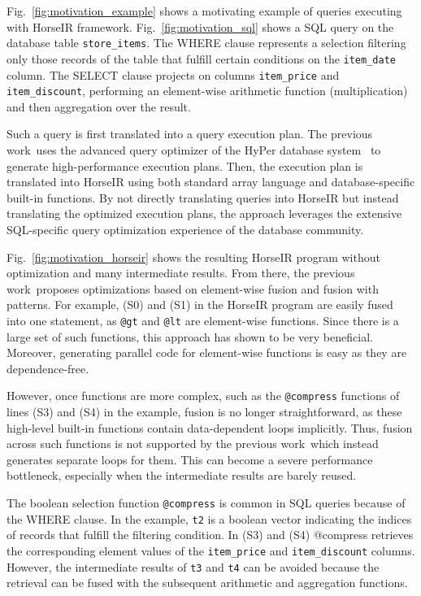 

Fig.~\ref{fig:motivation_example} shows a motivating example of queries
executing with HorseIR framework. Fig.~\ref{fig:motivation_sql} shows a SQL
query on the database table \texttt{store\_items}. The WHERE clause represents
a selection filtering only those records of the table that fulfill certain
conditions on the \texttt{item_date} column. The SELECT clause projects on
columns \texttt{item_price} and \texttt{item\_discount}, performing an
element-wise arithmetic function (multiplication) and then aggregation over the
result. 

Such a query is first translated into a query execution plan. The previous
work~\OldPaper uses the advanced query optimizer of the HyPer database
system~\cite{Neumann2011:HyPer} to generate high-performance execution plans.
Then, the execution plan is translated into HorseIR using both standard array
language and database-specific built-in functions. By not directly translating
queries into HorseIR but instead translating the optimized execution plans, the
approach leverages the extensive SQL-specific query optimization experience of
the database community.

Fig.~\ref{fig:motivation_horseir} shows the resulting HorseIR program without
optimization and many intermediate results. From there, the previous
work~\OldPaper proposes optimizations based on element-wise fusion and fusion
with patterns. For example, (S0) and (S1) in the HorseIR program are easily
fused into one statement, as \texttt{@gt} and \texttt{@lt} are element-wise
functions. Since there is a large set of such functions, this approach has
shown to be very beneficial. 
Moreover, generating parallel code for element-wise functions is easy as they
are dependence-free.


However, once functions are more complex, such as the \texttt{@compress}
functions of lines (S3) and (S4) in the example, fusion is no longer
straightforward, as these high-level built-in functions contain data-dependent
loops implicitly. 
Thus, fusion across such functions is not supported by the previous
work~\OldPaper which instead generates separate loops for them.
This can become a severe performance bottleneck, especially when the
intermediate results are barely reused. 

The boolean selection function \texttt{@compress} is common in SQL queries
because of the WHERE clause.
In the example, \texttt{t2} is a boolean vector indicating the indices of
records that fulfill the filtering condition. In (S3) and (S4)
@compress retrieves the corresponding element values of the
\texttt{item\_price} and \texttt{item\_discount} columns.
However, the intermediate results of \texttt{t3} and \texttt{t4} can be avoided
because the retrieval can be fused with the subsequent arithmetic and
aggregation functions. 

